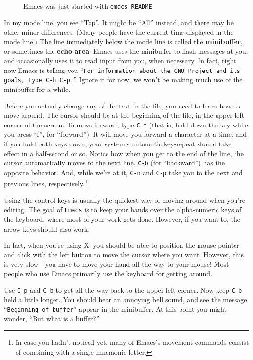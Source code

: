 \begin{figure}[tbh]\label{emacs-shot-1}
\begin{center}
\end{center}
\caption{Emacs was just started with {\tt emacs README}}
\end{figure}

In my mode line, you see ``Top''. It might be ``All'' instead, and
there may be other minor differences. (Many people have the current
time displayed in the mode line.) The line immediately below the mode
line is called the {\bf minibuffer}, or sometimes the {\bf echo area}.
Emacs uses the minibuffer to flash messages at you, and occasionally
uses it to read input from you, when necessary.  In fact, right now
Emacs is telling you ``{\tt For information about the GNU Project and
  its goals, type C-h C-p.}'' Ignore it for now; we won't be making
much use of the minibuffer for a while.

Before you actually change any of the text in the file, you need to
learn how to move around.  The cursor should be at the beginning of
the file, in the upper-left corner of the screen.  To move forward,
type {\tt C-f} (that is, hold down the  key while you
press ``f'', for ``forward'').  It will move you forward a character
at a time, and if you hold both keys down, your system's automatic
key-repeat should take effect in a half-second or so.  Notice how when
you get to the end of the line, the cursor automatically moves to the
next line.  {\tt C-b} (for ``backward'') has the opposite behavior.  And,
while we're at it, {\tt C-n} and {\tt C-p} take you to the next and
previous lines, respectively.\footnote{In case you hadn't noticed yet,
  many of Emacs's movement commands consist of combining
   with a single mnemonic letter.}

Using the control keys is usually the quickest way of moving around
when you're editing. The goal of {\tt Emacs} is to keep your hands
over the alpha-numeric keys of the keyboard, where most of your work
gets done. However, if you want to, the arrow keys should also work.

\xwarn In fact, when you're using X, you should be able to position
the mouse pointer and click with the left button to move the cursor
where you want. However, this is very slow---you have to move your
hand all the way to your mouse! Most people who use Emacs primarily
use the keyboard for getting around.

Use {\tt C-p} and {\tt C-b} to get all the way back to the upper-left
corner. Now keep {\tt C-b} held a little longer.  You should
hear an annoying bell sound, and see the message ``{\tt Beginning of
  buffer}'' appear in the minibuffer.  At this point you
might wonder, ``But what is a buffer?''

